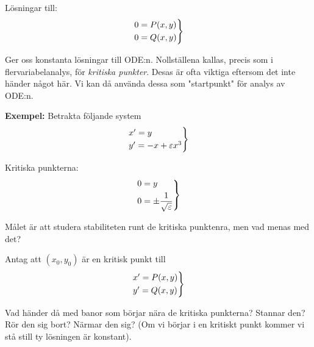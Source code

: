 \par\bigskip
\noindent Lösningar till:
\begin{equation*}
  \begin{gathered}
    \begin{rcases*}
      0=P(x,y)\\
      0=Q(x,y)
    \end{rcases*}
  \end{gathered}
\end{equation*}
\par\bigskip
\noindent Ger oss konstanta lösningar till ODE:n. Nollställena kallas, precis som i flervariabelanalys, för \textit{kritiska punkter}. Desas är ofta viktiga eftersom det inte händer något här. Vi kan då använda dessa som "startpunkt" för analys av ODE:n.
\par\bigskip
\noindent\textbf{Exempel:} Betrakta följande system
\begin{equation*}
  \begin{gathered}
    \begin{rcases*}
      x^{\prime} = y\\
      y^{\prime} = -x+\varepsilon x^3
    \end{rcases*}
  \end{gathered}
\end{equation*}
\par\bigskip
\noindent Kritiska punkterna:
\begin{equation*}
  \begin{gathered}
    \begin{rcases*}
      0 = y\\
      0=\pm\dfrac{1}{\sqrt{\varepsilon}}
    \end{rcases*}
  \end{gathered}
\end{equation*}
\par\bigskip
\noindent Målet är att studera stabiliteten runt de kritiska punktenra, men vad menas med det?\par
\noindent Antag att $(x_0, y_0)$ är en kritisk punkt till
\begin{equation*}
  \begin{gathered}
    \begin{rcases*}
      x^{\prime} = P(x,y)\\
      y^{\prime} = Q(x,y)
    \end{rcases*}
  \end{gathered}
\end{equation*}
\par\bigskip
\noindent Vad händer då med banor som börjar nära de kritiska punkterna? Stannar den? Rör den sig bort? Närmar den sig? (Om vi börjar i en kritiskt punkt kommer vi stå still ty lösningen är konstant).
\par\bigskip
